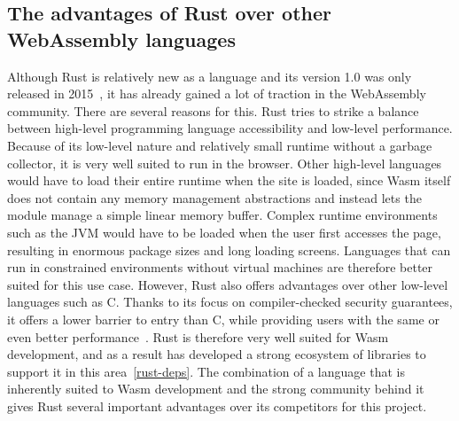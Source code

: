 \subsection{The advantages of Rust over other WebAssembly languages} \label{rust-vs-other-wasm}
Although Rust is relatively new as a language and its version 1.0 was only released in 2015~\cite{rustreleases}, it has already gained a lot of traction in the WebAssembly community.
There are several reasons for this. Rust tries to strike a balance between high-level programming language accessibility and low-level performance.
Because of its low-level nature and relatively small runtime without a garbage collector, it is very well suited to run in the browser. Other high-level languages would have to load their entire runtime when the site is loaded, since Wasm itself does not contain any memory management abstractions and instead lets the module manage a simple linear memory buffer.
Complex runtime environments such as the JVM would have to be loaded when the user first accesses the page, resulting in enormous package sizes and long loading screens.
Languages that can run in constrained environments without virtual machines are therefore better suited for this use case.
However, Rust also offers advantages over other low-level languages such as C. Thanks to its focus on compiler-checked security guarantees, it offers a lower barrier to entry than C, while providing users with the same or even better performance~\cite{medin2021performance}.
Rust is therefore very well suited for Wasm development, and as a result has developed a strong ecosystem of libraries to support it in this area~\ref{rust-deps}.
The combination of a language that is inherently suited to Wasm development and the strong community behind it gives Rust several important advantages over its competitors for this project.


